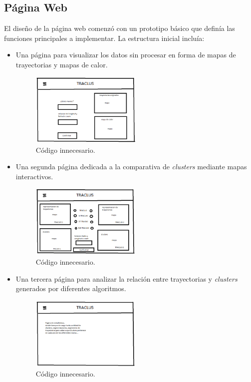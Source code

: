 \subsection{Página Web}

El diseño de la página web comenzó con un prototipo básico que definía las funciones principales a implementar. La estructura inicial incluía:  
\begin{itemize}
    \item Una página para visualizar los datos sin procesar en forma de mapas de trayectorias y mapas de calor.
    
    \begin{figure}[h!]
    		\centering
    		\includegraphics[width=0.5\textwidth]{img/prototipo_web1.png}
    		\caption{Código innecesario.}
	\end{figure}
	\FloatBarrier
    
    \item Una segunda página dedicada a la comparativa de \textit{clusters} mediante mapas interactivos.
    
    \begin{figure}[h!]
    		\centering
    		\includegraphics[width=0.5\textwidth]{img/prototipo_web2.png}
    		\caption{Código innecesario.}
	\end{figure}
	\FloatBarrier
    
    \item Una tercera página para analizar la relación entre trayectorias y \textit{clusters} generados por diferentes algoritmos.
    
    \begin{figure}[h!]
    		\centering
    		\includegraphics[width=0.5\textwidth]{img/prototipo_web3.png}
    		\caption{Código innecesario.}
	\end{figure}
	\FloatBarrier
\end{itemize}

